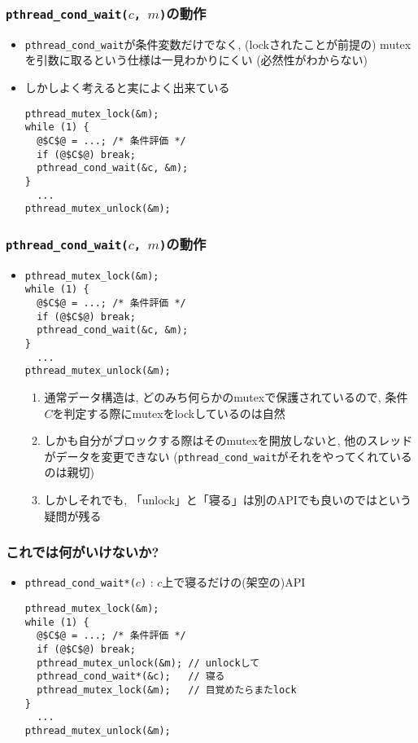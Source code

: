\documentclass[12pt,dvipdfmx]{beamer}
\begin{document}
\begin{frame}[fragile]
  \frametitle{{\tt pthread\_cond\_wait($c$, $m$)}の動作}
  \begin{itemize}
  \item {\tt pthread\_cond\_wait}が条件変数だけでなく,
    (lockされたことが前提の) mutex を引数に取るという仕様は一見わかりにくい
    (必然性がわからない)
  \item しかしよく考えると実によく出来ている
\begin{lstlisting}
pthread_mutex_lock(&m);
while (1) {
  @$C$@ = ...; /* 条件評価 */
  if (@$C$@) break;
  pthread_cond_wait(&c, &m);
}
  ...
pthread_mutex_unlock(&m);      
\end{lstlisting}
\end{itemize}
\end{frame}

\begin{frame}[fragile]
  \frametitle{{\tt pthread\_cond\_wait($c$, $m$)}の動作}
  \begin{itemize}
  \item []
\begin{lstlisting}
pthread_mutex_lock(&m);
while (1) {
  @$C$@ = ...; /* 条件評価 */
  if (@$C$@) break;
  pthread_cond_wait(&c, &m);
}
  ...
pthread_mutex_unlock(&m);      
\end{lstlisting}
\begin{enumerate}
\item<1-> 通常データ構造は, どのみち何らかのmutexで保護されているので,
  条件$C$を判定する際にmutexをlockしているのは自然
\item<2-> しかも自分がブロックする際はそのmutexを開放しないと,
  他のスレッドがデータを変更できない
  ({\tt pthread\_cond\_wait}がそれをやってくれているのは親切)
\item<3-> しかしそれでも, 「unlock」と「寝る」は別のAPIでも良いのではという
  疑問が残る
\end{enumerate}
\end{itemize}
\end{frame}

\begin{frame}[fragile]
  \frametitle{これでは何がいけないか?}
  \begin{itemize}
  \item {\tt pthread\_cond\_wait*($c$)} : $c$上で寝るだけの(架空の)API
\begin{lstlisting}
pthread_mutex_lock(&m);
while (1) {
  @$C$@ = ...; /* 条件評価 */
  if (@$C$@) break;
  pthread_mutex_unlock(&m); // unlockして
  pthread_cond_wait*(&c);   // 寝る
  pthread_mutex_lock(&m);   // 目覚めたらまたlock
}
  ...
pthread_mutex_unlock(&m);      
\end{lstlisting}
\end{itemize}
\end{frame}
\end{document}
